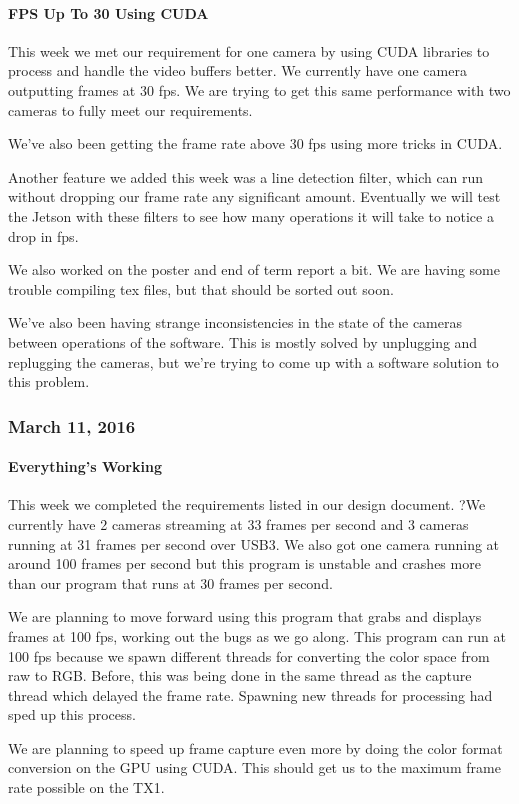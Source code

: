 \paragraph{FPS Up To 30 Using CUDA}
This week we met our requirement for one camera by using CUDA libraries to process and handle the video buffers better. We currently have one camera outputting frames at 30 fps. We are trying to get this same performance with two cameras to fully meet our requirements.
\par
We've also been getting the frame rate above 30 fps using more tricks in CUDA.
\par
Another feature we added this week was a line detection filter, which can run without dropping our frame rate any significant amount. Eventually we will test the Jetson with these filters to see how many operations it will take to notice a drop in fps.
\par
We also worked on the poster and end of term report a bit. We are having some trouble compiling tex files, but that should be sorted out soon.
\par
We've also been having strange inconsistencies in the state of the cameras between operations of the software. This is mostly solved by unplugging and replugging the cameras, but we're trying to come up with a software solution to this problem.\\

\subsubsection{March 11, 2016}
\paragraph{Everything's Working} 
This week we completed the requirements listed in our design document. ?We currently have 2 cameras streaming at 33 frames per second and 3 cameras running at 31 frames per second over USB3. We also got one camera running at around 100 frames per second but this program is unstable and crashes more than our program that runs at 30 frames per second.
\par
We are planning to move forward using this program that grabs and displays frames at 100 fps, working out the bugs as we go along. This program can run at 100 fps because we spawn different threads for converting the color space from raw to RGB. Before, this was being done in the same thread as the capture thread which delayed the frame rate. Spawning new threads for processing had sped up this process.
\par
We are planning to speed up frame capture even more by doing the color format conversion on the GPU using CUDA. This should get us to the maximum frame rate possible on the TX1.\\